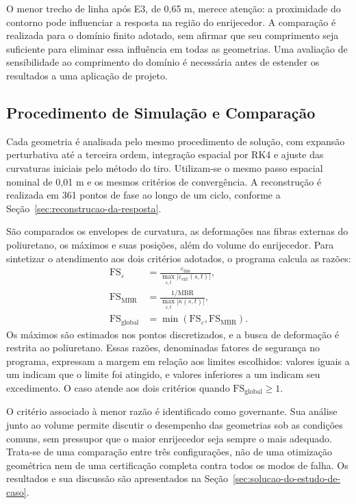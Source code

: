 \documentclass[arial,centeredequations,english,brazilian,oneside,section=TITLE]{ifes8}
\begin{document}
O menor trecho de linha após E3, de 0,65 m, merece atenção: a proximidade
do contorno pode influenciar a resposta na região do enrijecedor. A
comparação é realizada para o domínio finito adotado, sem afirmar que
seu comprimento seja suficiente para eliminar essa influência em todas
as geometrias. Uma avaliação de sensibilidade ao comprimento do domínio
é necessária antes de estender os resultados a uma aplicação de projeto.

\subsection{Procedimento de Simulação e Comparação}
\label{sec:procedimento-estudo-de-caso}

Cada geometria é analisada pelo mesmo procedimento de solução, com expansão
perturbativa até a terceira ordem, integração espacial por RK4 e ajuste
das curvaturas iniciais pelo método do tiro. Utilizam-se o mesmo passo
espacial nominal de 0,01 m e os mesmos critérios de convergência.
A reconstrução é realizada em 361 pontos de fase ao longo de um ciclo,
conforme a Seção~\ref{sec:reconstrucao-da-resposta}.

São comparados os envelopes de curvatura, as deformações nas fibras externas
do poliuretano, os máximos e suas posições, além do volume do enrijecedor.
Para sintetizar o atendimento aos dois critérios adotados, o programa
calcula as razões:
\begin{align}
  \mathrm{FS}_{\varepsilon}
    &=\frac{\varepsilon_{\mathrm{lim}}}
      {\max_{s,t}|\varepsilon_{\mathrm{ext}}(s,t)|},
    \label{eq:fs-deformacao-estudo}\\
  \mathrm{FS}_{\mathrm{MBR}}
    &=\frac{1/\mathrm{MBR}}{\max_{s,t}|\kappa(s,t)|},
    \label{eq:fs-mbr-estudo}\\
  \mathrm{FS}_{\mathrm{global}}
    &=\min(\mathrm{FS}_{\varepsilon},\mathrm{FS}_{\mathrm{MBR}}).
    \label{eq:fs-global-estudo}
\end{align}
Os máximos são estimados nos pontos discretizados, e a busca de deformação
é restrita ao poliuretano. Essas razões, denominadas fatores de segurança
no programa, expressam a margem em relação aos limites escolhidos: valores
iguais a um indicam que o limite foi atingido, e valores inferiores a um
indicam seu excedimento. O caso atende aos dois critérios quando
$\mathrm{FS}_{\mathrm{global}}\geq1$.

O critério associado à menor razão é identificado como governante. Sua
análise junto ao volume permite discutir o desempenho das geometrias sob
as condições comuns, sem pressupor que o maior enrijecedor seja sempre
o mais adequado. Trata-se de uma comparação entre três configurações,
não de uma otimização geométrica nem de uma certificação completa contra
todos os modos de falha. Os resultados e sua discussão são apresentados
na Seção~\ref{sec:solucao-do-estudo-de-caso}.
\end{document}
